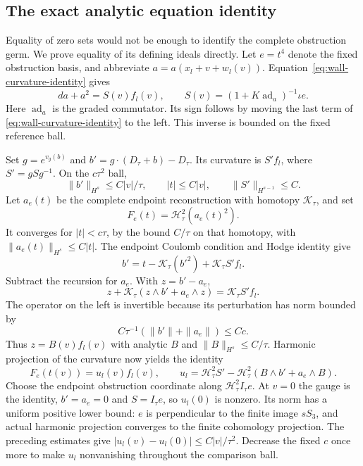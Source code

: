 \documentclass[11pt]{amsart}
\theoremstyle{definition}
\theoremstyle{remark}
\newcommand{\ad}{\operatorname{ad}}
\begin{document}
\subsection{The exact analytic equation identity}
Equality of zero sets would not be enough to identify the complete
obstruction germ. We prove equality of its defining ideals directly.
Let $e=t^4$ denote the fixed obstruction basis, and abbreviate
$a=a(x_l+v+w_l(v))$. Equation~\eqref{eq:wall-curvature-identity} gives
\begin{equation}\label{eq:curvature-factor}
 da+a^2=S(v)f_l(v),\qquad S(v)=(1+K\ad_a)^{-1}\iota e.
\end{equation}
Here $\ad_a$ is the graded commutator. Its sign follows by moving
the last term of \eqref{eq:wall-curvature-identity} to the left.
This inverse is bounded on the fixed reference ball.

Set $g=e^{v_g(b)}$ and $b'=g\cdot(D_\tau+b)-D_\tau$.
Its curvature is $S'f_l$, where $S'=gSg^{-1}$.
On the $c\tau^2$ ball,
\[
 \|b'\|_{H^s}\le C|v|/\tau,\qquad |t|\le C|v|,
 \qquad \|S'\|_{H^{s-1}}\le C.
\]
Let $a_e(t)$ be the complete endpoint reconstruction with homotopy
$\mathcal K_\tau$, and set
\[
 F_e(t)=\mathcal H_\tau^2(a_e(t)^2).
\]
It converges for $|t|<c\tau$, by the bound $C/\tau$ on that
homotopy, with $\|a_e(t)\|_{H^s}\le C|t|$.
The endpoint Coulomb condition and Hodge identity give
\[
 b'=t-\mathcal K_\tau(b'^2)+\mathcal K_\tau S'f_l.
\]
Subtract the recursion for $a_e$. With $z=b'-a_e$,
\[
 z+\mathcal K_\tau(z\wedge b'+a_e\wedge z)
          =\mathcal K_\tau S'f_l.
\]
The operator on the left is invertible because its perturbation has
norm bounded by
\[
 C\tau^{-1}(\|b'\|+\|a_e\|)\le Cc.
\]
Thus $z=B(v)f_l(v)$ with analytic $B$ and $\|B\|_{H^s}\le C/\tau$.
Harmonic projection of the curvature now yields the identity
\begin{equation}\label{eq:analytic-ideal-identity}
 F_e(t(v))=u_l(v)f_l(v),\qquad
 u_l=\mathcal H_\tau^2S'
    -\mathcal H_\tau^2(B\wedge b'+a_e\wedge B).
\end{equation}
Choose the endpoint obstruction coordinate along
$\mathcal H_\tau^2I_\tau e$. At $v=0$ the gauge is the identity,
$b'=a_e=0$ and $S=I_\tau e$, so $u_l(0)$ is nonzero.
Its norm has a uniform positive lower bound: $e$ is perpendicular
to the finite image $sS_3$, and actual harmonic projection converges
to the finite cohomology projection. The preceding estimates give
$|u_l(v)-u_l(0)|\le C|v|/\tau^2$. Decrease the fixed $c$ once
more to make $u_l$ nonvanishing throughout the comparison ball.
\end{document}

